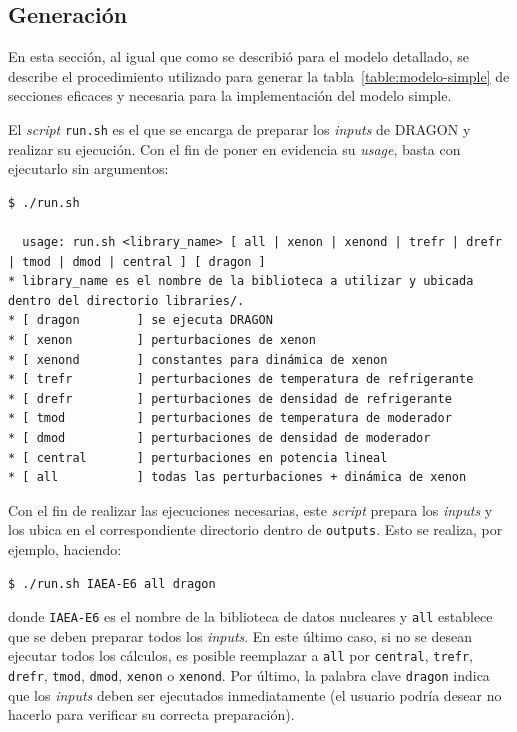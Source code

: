\documentclass[11pt]{article}
\begin{document}
\subsection{Generación}

En esta sección, al igual que como se describió para el modelo detallado, se describe el procedimiento utilizado para generar la tabla~\ref{table:modelo-simple} de secciones eficaces y necesaria para la implementación del modelo simple.

El \emph{script} \texttt{run.sh} es el que se encarga de preparar los \emph{inputs} de DRAGON y realizar su ejecución. Con el fin de poner en evidencia su \emph{usage}, basta con ejecutarlo sin argumentos:

\begin{lstlisting}[style=bash_tecna]
$ ./run.sh 

  usage: run.sh <library_name> [ all | xenon | xenond | trefr | drefr | tmod | dmod | central ] [ dragon ]
* library_name es el nombre de la biblioteca a utilizar y ubicada dentro del directorio libraries/.
* [ dragon        ] se ejecuta DRAGON
* [ xenon         ] perturbaciones de xenon
* [ xenond        ] constantes para dinámica de xenon
* [ trefr         ] perturbaciones de temperatura de refrigerante
* [ drefr         ] perturbaciones de densidad de refrigerante
* [ tmod          ] perturbaciones de temperatura de moderador
* [ dmod          ] perturbaciones de densidad de moderador
* [ central       ] perturbaciones en potencia lineal
* [ all           ] todas las perturbaciones + dinámica de xenon

\end{lstlisting}

Con el fin de realizar las ejecuciones necesarias, este \emph{script} prepara los \emph{inputs} y los ubica en el correspondiente directorio dentro de \texttt{outputs}. Esto se realiza, por ejemplo, haciendo: 

\begin{lstlisting}[style=bash_tecna]
$ ./run.sh IAEA-E6 all dragon
\end{lstlisting}

\noindent
donde \texttt{IAEA-E6} es el nombre de la biblioteca de datos nucleares y \texttt{all} establece que se deben preparar todos los \emph{inputs}. En este último caso, si no se desean ejecutar todos los cálculos, es posible reemplazar a \texttt{all} por \texttt{central}, \texttt{trefr}, \texttt{drefr}, \texttt{tmod}, \texttt{dmod}, \texttt{xenon} o \texttt{xenond}. Por último, la palabra clave \texttt{dragon} indica que los \emph{inputs} deben ser ejecutados inmediatamente (el usuario podría desear no hacerlo para verificar su correcta preparación).
\end{document}
